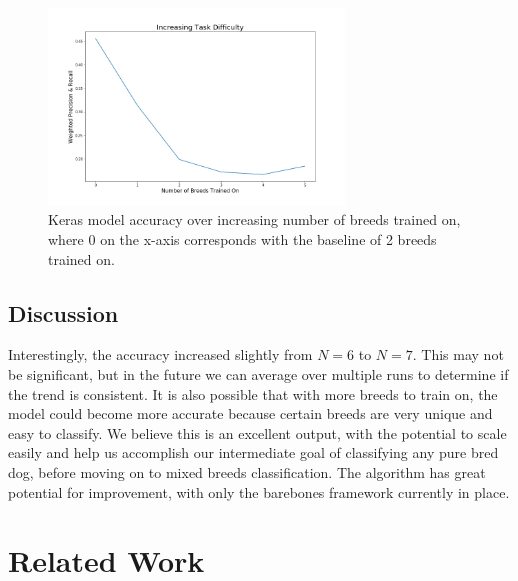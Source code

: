 \documentclass[12pt]{article}
\begin{document}
 \begin{figure}[h!]
 \centering
  \includegraphics[width=0.7\textwidth]{results}
  \caption{Keras model accuracy over increasing number of breeds trained on, where 0 on the x-axis corresponds with the baseline of 2 breeds trained on.}
  \end{figure}
  
\subsection{Discussion}

Interestingly, the accuracy increased slightly from $N=6$ to $N=7$. This may not be significant, but in the future we can average over multiple runs to determine if the trend is consistent. It is also possible that with more breeds to train on, the model could become more accurate because certain breeds are very unique and easy to classify. We believe this is an excellent output, with the potential to scale easily and help us accomplish our intermediate goal of classifying any pure bred dog, before moving on to mixed breeds classification. The algorithm has great potential for improvement, with only the barebones framework currently in place. 

\section{Related Work}
\end{document}
